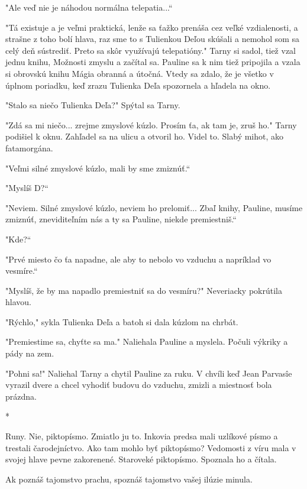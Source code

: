 \documentclass{book}
\begin{document}
"$ $Ale veď nie je náhodou normálna telepatia...“

"$ $Tá existuje a je veľmi praktická, lenže sa ťažko prenáša cez veľké vzdialenosti, a strašne z toho bolí hlava, raz sme to s Tulienkou Deľou skúšali a nemohol som sa celý deň sústrediť. Preto sa skôr využívajú telepatióny."$ $ Tarny si sadol, tiež vzal jednu knihu, Možnosti zmyslu a začítal sa. Pauline sa k nim tiež pripojila a vzala si obrovskú knihu Mágia obranná a útočná. Vtedy sa zdalo, že je všetko v úplnom poriadku, keď zrazu Tulienka Deľa spozornela a hľadela na okno.

"$ $Stalo sa niečo Tulienka Deľa?"$ $ Spýtal sa Tarny.

"$ $Zdá sa mi niečo... zrejme zmyslové kúzlo. Prosím ťa, ak tam je, zruš ho."$ $ Tarny podišiel k oknu. Zahľadel sa na ulicu a otvoril ho. Videl to. Slabý mihot, ako fatamorgána.

"$ $Veľmi silné zmyslové kúzlo, mali by sme zmiznúť.“

"$ $Myslíš D?“

"$ $Neviem. Silné zmyslové kúzlo, neviem ho prelomiť... Zbaľ knihy, Pauline, musíme zmiznúť, zneviditeľním nás a ty sa Pauline, niekde premiestniš.“

"$ $Kde?“

"$ $Prvé miesto čo ťa napadne, ale aby to nebolo vo vzduchu a napríklad vo vesmíre.“

"$ $Myslíš, že by ma napadlo premiestniť sa do vesmíru?"$ $ Neveriacky pokrútila hlavou.

"$ $Rýchlo,"$ $ sykla Tulienka Deľa a batoh si dala kúzlom na chrbát.

"$ $Premiestime sa, chyťte sa ma."$ $ Naliehala Pauline a myslela. Počuli výkriky a pády na zem.

"$ $Pohni sa!"$ $ Naliehal Tarny a chytil Pauline za ruku. V chvíli keď Jean Parvasîe vyrazil dvere a chcel vyhodiť budovu do vzduchu, zmizli a miestnosť bola prázdna.

\begin{center}

*

\end{center}

Runy. Nie, piktopísmo. Zmiatlo ju to. Inkovia predsa mali uzlíkové písmo a trestali čarodejníctvo. Ako tam mohlo byť piktopísmo? Vedomosti z víru mala v svojej hlave pevne zakorenené. Staroveké piktopísmo. Spoznala ho a čítala.

Ak poznáš tajomstvo prachu, spoznáš tajomstvo vašej ilúzie minula.
\end{document}
